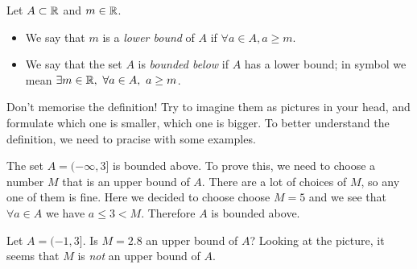 \documentclass[12pt]{article}
\begin{document}
\begin{definition}
  Let \(A\subset\mathbb{R}\) and \(m\in\mathbb{R}\).
  \begin{itemize}
  \item
    We say that \(m\) is a \emph{lower bound} of \(A\) if
    \(\forall a\in A, a\geq m\).
  \item
    We say that the set \(A\) is \emph{bounded below}
    if \(A\) has a lower bound; in symbol we mean
    \(\exists m\in\mathbb{R},~\forall a\in A,~a\geq m\).
  \end{itemize}
\end{definition}

Don't memorise the definition! Try to imagine them as pictures in your
head, and formulate which one is smaller, which one is bigger.
To better understand the definition, we need to pracise with some examples.

\begin{example}
  The set \(A = (-\infty, 3]\) is bounded above. To prove this, we
  need to choose a number \(M\) that is an upper bound of \(A\).
  There are a lot of choices of \(M\), so any one of them is fine. Here
  we decided to choose choose \(M=5\) and we see that
  \(\forall a\in A\) we have \(a\leq 3< M\).
  Therefore \(A\) is bounded above.
\end{example}

\begin{example}
  Let \(A = (-1, 3]\). Is \(M=2.8\) an upper bound of \(A\)?
  Looking at the picture, it seems that \(M\) is \emph{not}
  an upper bound of \(A\).
\end{example}
\end{document}
